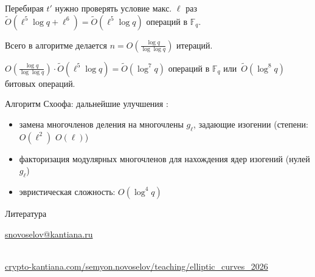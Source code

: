 \documentclass{beamer}
\begin{document}
\begin{frame}
Перебирая $t'$ нужно проверять условие макс. $\ell$ раз
\MyImplies
$\widetilde{O}(\ell^5 \log{q} + \ell^6) = \widetilde{O}(\ell^5 \log{q})$ операций в $\mathbb{F}_q$.

\vspace{1em}
Всего в алгоритме делается $n = O(\frac{\log{q}}{\log{\log{q}}})$ итераций.

\vspace{1em}
$O(\frac{\log{q}}{\log{\log{q}}}) \cdot \widetilde{O}(\ell^5 \log{q}) = \widetilde{O}(\log^7{q})$ операций в $\mathbb{F}_q$ или~$\widetilde{O}(\log^8{q})$ битовых операций.

\end{frame}

\begin{frame}{Алгоритм Схоофа: дальнейшие улучшения}
    :
    \begin{itemize}
        \item замена многочленов деления на многочлены $g_\ell$, задающие изогении (степени: $O(\ell^2)$ \structure{$\implies$} $O(\ell)$)
        \item факторизация модулярных многочленов для нахождения ядер изогений (нулей $g_\ell$)
        \item эвристическая сложность: $O(\log^4{q})$
    \end{itemize}
\end{frame}

\begin{frame}{Литература}
    \nocite{Blake1999}
    \nocite{Schoof1985}
    \nocite{CohenFrey+2005}
    \nocite{Washington2008}
    \printbibliography

    \begin{center}
        \begin{tcolorbox}[enhanced,hbox,colback=block-green-color-bg,colframe=subsection-color!120,title=Контакты,center title]
            \begin{varwidth}{\textwidth}
                \begin{center}
                    \href{mailto:snovoselov@kantiana.ru}{snovoselov@kantiana.ru}
                \end{center}
            \end{varwidth}
        \end{tcolorbox}	
    \end{center}
    
    \\
    {\footnotesize
    	\href{https://crypto-kantiana.com/semyon.novoselov/teaching/elliptic_curves_2026}{crypto-kantiana.com/semyon.novoselov/teaching/elliptic\_curves\_2026}
    }
\end{frame}
\end{document}
